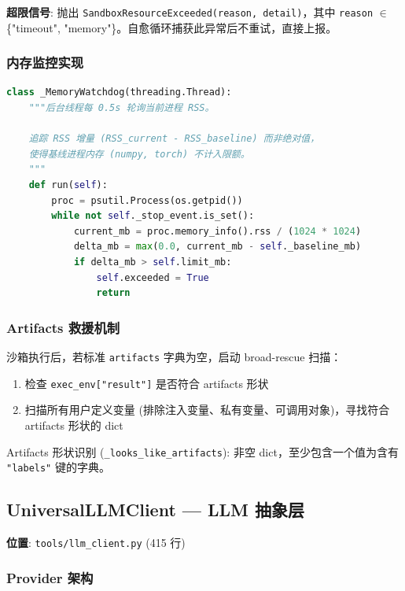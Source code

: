 \documentclass[12pt,a4paper]{article}
\begin{document}
\textbf{超限信号}: 抛出 \texttt{SandboxResourceExceeded(reason, detail)}，其中 \texttt{reason} $\in$ \{"timeout", "memory"\}。自愈循环捕获此异常后不重试，直接上报。

\subsubsection{内存监控实现}

\begin{lstlisting}[language=Python]
class _MemoryWatchdog(threading.Thread):
    """后台线程每 0.5s 轮询当前进程 RSS。

    追踪 RSS 增量 (RSS_current - RSS_baseline) 而非绝对值，
    使得基线进程内存 (numpy, torch) 不计入限额。
    """
    def run(self):
        proc = psutil.Process(os.getpid())
        while not self._stop_event.is_set():
            current_mb = proc.memory_info().rss / (1024 * 1024)
            delta_mb = max(0.0, current_mb - self._baseline_mb)
            if delta_mb > self.limit_mb:
                self.exceeded = True
                return
\end{lstlisting}

\subsubsection{Artifacts 救援机制}

沙箱执行后，若标准 \texttt{artifacts} 字典为空，启动 broad-rescue 扫描：

\begin{enumerate}[nosep]
    \item 检查 \texttt{exec\_env["result"]} 是否符合 artifacts 形状
    \item 扫描所有用户定义变量 (排除注入变量、私有变量、可调用对象)，寻找符合 artifacts 形状的 dict
\end{enumerate}

Artifacts 形状识别 (\texttt{\_looks\_like\_artifacts}): 非空 dict，至少包含一个值为含有 \texttt{"labels"} 键的字典。

\subsection{UniversalLLMClient --- LLM 抽象层}

\textbf{位置}: \texttt{tools/llm\_client.py} (415 行)

\subsubsection{Provider 架构}
\end{document}
